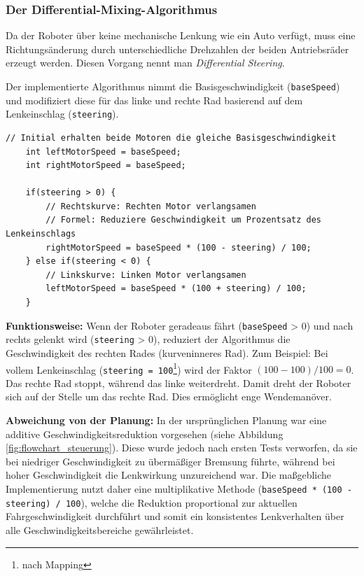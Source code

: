 \subsubsection{Der Differential-Mixing-Algorithmus}
Da der Roboter über keine mechanische Lenkung wie ein Auto verfügt, muss eine Richtungsänderung durch unterschiedliche Drehzahlen der beiden Antriebsräder erzeugt werden. Diesen Vorgang nennt man \textit{Differential Steering}.

Der implementierte Algorithmus nimmt die Basisgeschwindigkeit (\texttt{baseSpeed}) und modifiziert diese für das linke und rechte Rad basierend auf dem Lenkeinschlag (\texttt{steering}).

\begin{lstlisting}[style=motorStyle, caption={Berechnung der differenziellen Geschwindigkeiten}]
	// Initial erhalten beide Motoren die gleiche Basisgeschwindigkeit
	int leftMotorSpeed = baseSpeed;
	int rightMotorSpeed = baseSpeed;
	
	if(steering > 0) {
		// Rechtskurve: Rechten Motor verlangsamen
		// Formel: Reduziere Geschwindigkeit um Prozentsatz des Lenkeinschlags
		rightMotorSpeed = baseSpeed * (100 - steering) / 100;
	} else if(steering < 0) {
		// Linkskurve: Linken Motor verlangsamen
		leftMotorSpeed = baseSpeed * (100 + steering) / 100;
	}
\end{lstlisting}

\textbf{Funktionsweise:} Wenn der Roboter geradeaus fährt (\texttt{baseSpeed} > 0) und nach rechts gelenkt wird (\texttt{steering} > 0), reduziert der Algorithmus die Geschwindigkeit des rechten Rades (kurveninneres Rad).
Zum Beispiel: Bei vollem Lenkeinschlag (\texttt{steering = 100}\footnote{nach Mapping}) wird der Faktor $(100 - 100) / 100 = 0$. Das rechte Rad stoppt, während das linke weiterdreht. Damit dreht der Roboter sich auf der Stelle um das rechte Rad. Dies ermöglicht enge Wendemanöver.

\textbf{Abweichung von der Planung:} In der ursprünglichen Planung war eine additive Geschwindigkeitsreduktion vorgesehen (siehe Abbildung \ref{fig:flowchart_steuerung}). Diese wurde jedoch nach ersten Tests verworfen, da sie bei niedriger Geschwindigkeit zu übermäßiger Bremsung führte, während bei hoher Geschwindigkeit die Lenkwirkung unzureichend war. Die maßgebliche Implementierung nutzt daher eine multiplikative Methode (\texttt{baseSpeed * (100 - steering) / 100}), welche die Reduktion proportional zur aktuellen Fahrgeschwindigkeit durchführt und somit ein konsistentes Lenkverhalten über alle Geschwindigkeitsbereiche gewährleistet.

